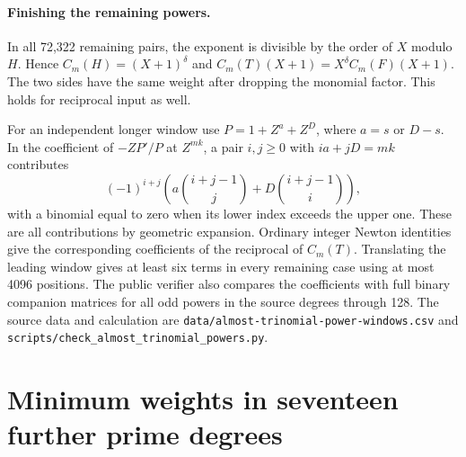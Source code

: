 \documentclass[11pt]{article}
\begin{document}
\paragraph{Finishing the remaining powers.}
In all 72,322 remaining pairs, the exponent is divisible by the
order of \(X\) modulo \(H\). Hence \(C_m(H)=(X+1)^\delta\) and
\(C_m(T)(X+1)=X^\delta C_m(F)(X+1)\). The two sides have the
same weight after dropping the monomial factor. This holds for
reciprocal input as well.

For an independent longer window use \(P=1+Z^a+Z^D\), where
\(a=s\) or \(D-s\). In the coefficient of \(-ZP'/P\) at
\(Z^{mk}\), a pair \(i,j\ge0\) with \(ia+jD=mk\) contributes
\[
   (-1)^{i+j}\left(
      a\binom{i+j-1}{j}+D\binom{i+j-1}{i}\right),
\]
with a binomial equal to zero when its lower index exceeds the
upper one. These are all contributions by geometric expansion.
Ordinary integer Newton identities give the corresponding
coefficients of the reciprocal of \(C_m(T)\). Translating the
leading window gives at least six terms in every remaining case
using at most 4096 positions. The public verifier also compares
the coefficients with full binary companion matrices for all odd
powers in the source degrees through 128. The source data and
calculation are \nolinkurl{data/almost-trinomial-power-windows.csv}
and \nolinkurl{scripts/check_almost_trinomial_powers.py}.


\clearpage
\section{Minimum weights in seventeen further prime degrees}
\label{sec:seventeen-prime-degrees}
\end{document}
